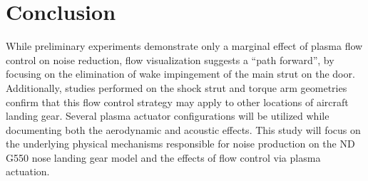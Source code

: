 \section{Conclusion}
While preliminary experiments demonstrate only a marginal effect of plasma flow control on noise reduction, flow visualization suggests a ``path forward'', by focusing on the elimination of wake impingement of the main strut on the door. Additionally, studies performed on the shock strut and torque arm geometries confirm that this flow control strategy may apply to other locations of aircraft landing gear. Several plasma actuator configurations will be utilized while documenting both the aerodynamic and acoustic effects. This study will focus on the underlying physical mechanisms responsible for noise production on the ND G550 nose landing gear model and the effects of flow control via plasma actuation.